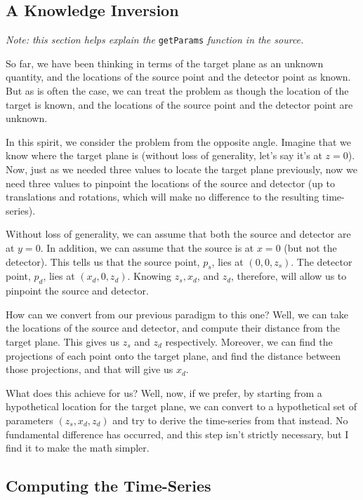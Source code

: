 \documentclass[11pt]{article}
\begin{document}
\subsection{A Knowledge Inversion}

\emph{Note: this section helps explain the} \texttt{getParams} \emph{function in the source.}

So far, we have been thinking in terms of the target plane as an unknown quantity, and the locations of the source point and the detector point as known. But as is often the case, we can treat the problem as though the location of the target is known, and the locations of the source point and the detector point are unknown. 

In this spirit, we consider the problem from the opposite angle. Imagine that we know where the target plane is (without loss of generality, let's say it's at $z=0$). Now, just as we needed three values to locate the target plane previously, now we need three values to pinpoint the locations of the source and detector (up to translations and rotations, which will make no difference to the resulting time-series).

Without loss of generality, we can assume that both the source and detector are at $y=0$. In addition, we can assume that the source is at $x=0$ (but not the detector). This tells us that the source point, $p_s$, lies at $(0, 0, z_s)$. The detector point, $p_d$, lies at $(x_d, 0, z_d)$. Knowing $z_s, x_d$, and $z_d$, therefore, will allow us to pinpoint the source and detector.

How can we convert from our previous paradigm to this one? Well, we can take the locations of the source and detector, and compute their distance from the target plane. This gives us $z_s$ and $z_d$ respectively. Moreover, we can find the projections of each point onto the target plane, and find the distance between those projections, and that will give us $x_d$.

What does this achieve for us? Well, now, if we prefer, by starting from a hypothetical location for the target plane, we can convert to a hypothetical set of parameters $(z_s, x_d, z_d)$ and try to derive the time-series from that instead. No fundamental difference has occurred, and this step isn't strictly necessary, but I find it to make the math simpler.

\subsection{Computing the Time-Series}
\end{document}
